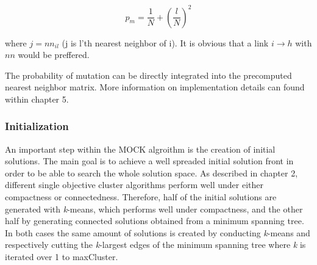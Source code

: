 \documentclass[parskip=half,DIV=14]{scrartcl}\usepackage[]{graphicx}\usepackage[]{color}
\begin{document}
\begin{displaymath}
p_m = \frac{1}{N} + (\frac{l}{N})^2
\end{displaymath}

where $j = nn_{il}$ (j is l'th nearest neighbor of i). It is obvious that a link $i\rightarrow h$ with $nn$ would be preffered.

The probability of mutation can be directly integrated into the precomputed nearest neighbor matrix. More information on implementation details can found within chapter 5.

\subsubsection{Initialization}
An important step within the MOCK algroithm is the creation of initial solutions. The main goal is to achieve a well spreaded initial solution front in order to be able to search the whole solution space. As described in chapter 2, different single objective cluster algorithms perform well under either compactness or connectedness. Therefore, half of the initial solutions are generated with \textit{k}-means, which performs well
under compactness, and the other half by generating connected solutions obtained from a minimum spanning tree. In both cases the same amount of solutions is created by conducting \textit{k}-means and respectively cutting the \textit{k}-largest edges of the minimum spanning tree where \textit{k} is iterated over 1 to maxCluster.
\end{document}
